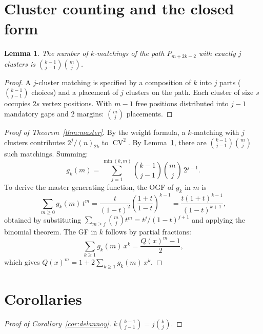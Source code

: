 \documentclass[11pt]{amsart}
\newtheorem{lemma}[theorem]{Lemma}
\theoremstyle{definition}
\DeclareMathOperator{\CV}{CV}
\begin{document}
\section{Cluster counting and the closed form}

\begin{lemma}\label{lem:cluster}
The number of $k$-matchings of the path $P_{m+2k-2}$ with exactly $j$ clusters is $\binom{k-1}{j-1}\binom{m}{j}$.
\end{lemma}

\begin{proof}
A $j$-cluster matching is specified by a composition of $k$ into $j$ parts ($\binom{k-1}{j-1}$ choices) and a placement of $j$ clusters on the path. Each cluster of size $s$ occupies $2s$ vertex positions. With $m{-}1$ free positions distributed into $j{-}1$ mandatory gaps and $2$ margins: $\binom{m}{j}$ placements.
\end{proof}

\begin{proof}[Proof of Theorem~\ref{thm:master}]
By the weight formula, a $k$-matching with $j$ clusters contributes $2^j/(n)_{2k}$ to $\CV^2$. By Lemma~\ref{lem:cluster}, there are $\binom{k-1}{j-1}\binom{m}{j}$ such matchings. Summing:
\[
g_k(m) = \sum_{j=1}^{\min(k,m)} \binom{k-1}{j-1}\binom{m}{j}\,2^{j-1}.
\]
To derive the master generating function, the OGF of $g_k$ in $m$ is
\[
\sum_{m \geq 0} g_k(m)\,t^m = \frac{t}{(1-t)^2}\left(\frac{1+t}{1-t}\right)^{k-1} = \frac{t(1+t)^{k-1}}{(1-t)^{k+1}},
\]
obtained by substituting $\sum_{m \geq j}\binom{m}{j}t^m = t^j/(1-t)^{j+1}$ and applying the binomial theorem. The GF in $k$ follows by partial fractions:
\[
\sum_{k \geq 1} g_k(m)\,x^k = \frac{Q(x)^m - 1}{2},
\]
which gives $Q(x)^m = 1 + 2\sum_{k \geq 1} g_k(m)\,x^k$.
\end{proof}

\section{Corollaries}

\begin{proof}[Proof of Corollary~\ref{cor:delannoy}]
$k\binom{k-1}{j-1} = j\binom{k}{j}$.
\end{proof}
\end{document}
